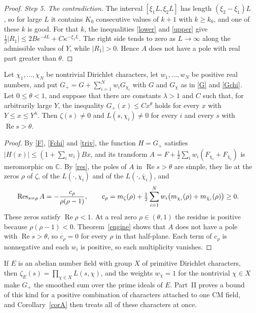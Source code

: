 \begin{proof}
\emph{Step 5. The contradiction.} The interval $[\xi_1L,\xi_2L]$ has length $(\xi_2-\xi_1)L$, so for large $L$ it contains $K_0$ consecutive values of $k+1$ with $k\ge k_0$, and one of these $k$ is good. For that $k$, the inequalities \eqref{lower} and \eqref{upper} give $\frac12\lvert R_1\rvert\le2Be^{-\delta L}+C\kappa^{-\xi_1L}$. The right side tends to zero as $L\to\infty$ along the admissible values of $Y$, while $\lvert R_1\rvert>0$. Hence $A$ does not have a pole with real part greater than $\theta$.
\end{proof}

\begin{corollary}\label{corA}
Let $\chi_1,\dots,\chi_N$ be nontrivial Dirichlet characters, let $w_1,\dots,w_N$ be positive real numbers, and put $G_+=G+\sum_{i=1}^Nw_iG_{\chi_i}$ with $G$ and $G_\chi$ as in \eqref{G} and \eqref{Gchi}. Let $0\le\theta<1$, and suppose that there are constants $\lambda>1$ and $C$ such that, for arbitrarily large $Y$, the inequality $G_+(x)\le Cx^\theta$ holds for every $x$ with $Y\le x\le Y^\lambda$. Then $\zeta(s)\ne0$ and $L(s,\chi_i)\ne0$ for every $i$ and every $s$ with $\operatorname{Re}s>\theta$.
\end{corollary}

\begin{proof}
By \eqref{F}, \eqref{Fchi} and \eqref{triv}, the function $H=G_+$ satisfies $\lvert H(x)\rvert\le(1+\sum_iw_i)Bx$, and its transform $A=F+\frac12\sum_iw_i(F_{\chi_i}+F_{\bar\chi_i})$ is meromorphic on $\mathbb C$. By \eqref{res}, the poles of $A$ in $\operatorname{Re}s>\theta$ are simple, they lie at the zeros $\rho$ of $\zeta$, of the $L(\cdot,\chi_i)$ and of the $L(\cdot,\bar\chi_i)$, and
\[
\operatorname{Res}_{s=\rho}A=-\frac{c_\rho}{\rho(\rho-1)},\qquad c_\rho=m_\zeta(\rho)+\tfrac12\sum_{i=1}^Nw_i\big(m_{\chi_i}(\rho)+m_{\bar\chi_i}(\rho)\big)\ge0 .
\]
These zeros satisfy $\operatorname{Re}\rho<1$. At a real zero $\rho\in(\theta,1)$ the residue is positive because $\rho(\rho-1)<0$. Theorem~\ref{engine} shows that $A$ does not have a pole with $\operatorname{Re}s>\theta$, so $c_\rho=0$ for every $\rho$ in that half-plane. Each term of $c_\rho$ is nonnegative and each $w_i$ is positive, so each multiplicity vanishes.
\end{proof}

If $E$ is an abelian number field with group $X$ of primitive Dirichlet characters, then $\zeta_E(s)=\prod_{\chi\in X}L(s,\chi)$, and the weights $w_\chi=1$ for the nontrivial $\chi\in X$ make $G_+$ the smoothed sum over the prime ideals of $E$. Part~II proves a bound of this kind for a positive combination of characters attached to one CM field, and Corollary~\ref{corA} then treats all of these characters at once.
